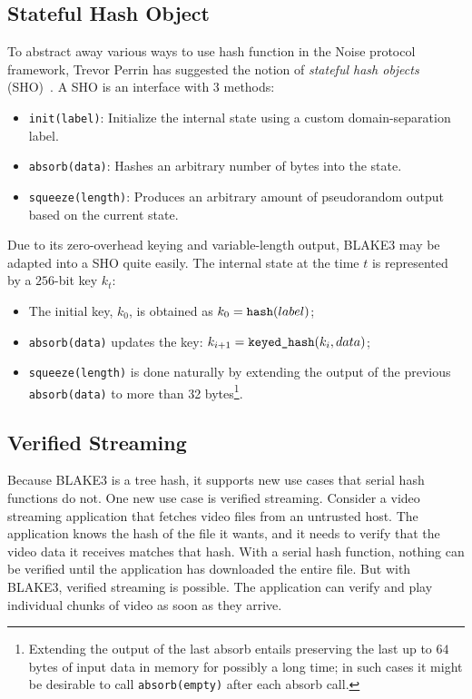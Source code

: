 \documentclass[11pt,notitlepage,a4paper]{article}
\newcommand{\flag}[1]{\texttt{\detokenize{#1}}\xspace}
\begin{document}
\subsection{Stateful Hash Object}\label{sec:sho}

To abstract away various ways to use hash function in the Noise protocol framework, Trevor Perrin has suggested the notion of \emph{stateful hash objects} (SHO)~\cite{Perrin19}. A SHO is an interface with 3 methods:
\begin{itemize}
  \item \texttt{init(label)}: Initialize the internal state using a custom domain-separation label.
  \item \texttt{absorb(data)}: Hashes an arbitrary number of bytes into the state.
  \item \texttt{squeeze(length)}: Produces an arbitrary amount of pseudorandom output based on the current state.
\end{itemize}
Due to its zero-overhead keying and variable-length output, BLAKE3 may be adapted into a SHO quite easily. The internal state at the time $t$ is represented by a $256$-bit key $k_t$:
\begin{itemize}
  \item The initial key, $k_0$, is obtained as $k_0 = \text{\flag{hash}}(label)$;
  \item \texttt{absorb(data)} updates the key: $k_{i+1} = \text{\flag{keyed_hash}}(k_i, data)$;
  \item \texttt{squeeze(length)} is done naturally by extending the output of the previous \texttt{absorb(data)} to more than 32 bytes\footnote{Extending the output of the last absorb entails preserving the last up to $64$ bytes of input data in memory for possibly a long time; in such cases it might be desirable to call \texttt{absorb(empty)} after each absorb call.}.
\end{itemize}

\subsection{Verified Streaming}\label{sec:verifiedstreaming}

Because BLAKE3 is a tree hash, it supports new use cases that serial hash
functions do not. One new use case is verified streaming. Consider a video
streaming application that fetches video files from an untrusted host. The
application knows the hash of the file it wants, and it needs to verify that
the video data it receives matches that hash. With a serial hash function,
nothing can be verified until the application has downloaded the entire file.
But with BLAKE3, verified streaming is possible. The application can verify and
play individual chunks of video as soon as they arrive.
\end{document}
